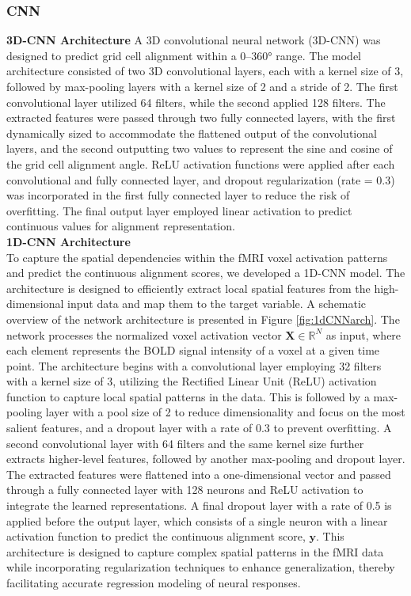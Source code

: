 \documentclass[a4paper]{article}
\begin{document}
\subsubsection{\textbf{CNN}}
\noindent \textbf{3D-CNN Architecture}
\noindent A 3D convolutional neural network (3D-CNN) was designed to predict grid cell alignment within a 0–360° range. The model architecture consisted of two 3D convolutional layers, each with a kernel size of 3, followed by max-pooling layers with a kernel size of 2 and a stride of 2. The first convolutional layer utilized 64 filters, while the second applied 128 filters. The extracted features were passed through two fully connected layers, with the first dynamically sized to accommodate the flattened output of the convolutional layers, and the second outputting two values to represent the sine and cosine of the grid cell alignment angle. ReLU activation functions were applied after each convolutional and fully connected layer, and dropout regularization (rate = 0.3) was incorporated in the first fully connected layer to reduce the risk of overfitting. The final output layer employed linear activation to predict continuous values for alignment representation.\\

\noindent \textbf{1D-CNN Architecture}\\
To capture the spatial dependencies within the fMRI voxel activation patterns and predict the continuous alignment scores, we developed a 1D-CNN model. The architecture is designed to efficiently extract local spatial features from the high-dimensional input data and map them to the target variable. A schematic overview of the network architecture is presented in Figure \ref{fig:1dCNNarch}. The network processes the normalized voxel activation vector \(\mathbf{X} \in \mathbb{R}^{N}\) as input, where each element represents the BOLD signal intensity of a voxel at a given time point. The architecture begins with a convolutional layer employing 32 filters with a kernel size of 3, utilizing the Rectified Linear Unit (ReLU) activation function to capture local spatial patterns in the data. This is followed by a max-pooling layer with a pool size of 2 to reduce dimensionality and focus on the most salient features, and a dropout layer with a rate of 0.3 to prevent overfitting. A second convolutional layer with 64 filters and the same kernel size further extracts higher-level features, followed by another max-pooling and dropout layer. The extracted features were flattened into a one-dimensional vector and passed through a fully connected layer with 128 neurons and ReLU activation to integrate the learned representations. A final dropout layer with a rate of 0.5 is applied before the output layer, which consists of a single neuron with a linear activation function to predict the continuous alignment score, \(\mathbf{y}\). This architecture is designed to capture complex spatial patterns in the fMRI data while incorporating regularization techniques to enhance generalization, thereby facilitating accurate regression modeling of neural responses.\\
\end{document}
